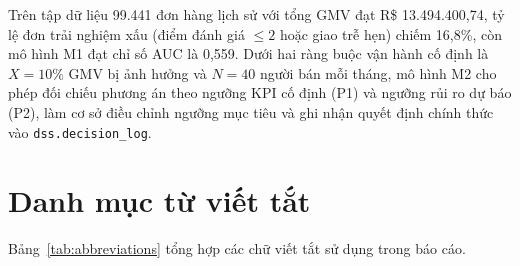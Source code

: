 \documentclass[a4paper]{article}
\begin{document}
Trên tập dữ liệu 99.441 đơn hàng lịch sử với tổng GMV đạt R\$ 13.494.400,74, tỷ lệ đơn trải nghiệm xấu (điểm đánh giá $\le 2$ hoặc giao trễ hẹn) chiếm 16,8\%, còn mô hình M1 đạt chỉ số AUC là 0,559. Dưới hai ràng buộc vận hành cố định là $X = 10\%$ GMV bị ảnh hưởng và $N = 40$ người bán mỗi tháng, mô hình M2 cho phép đối chiếu phương án theo ngưỡng KPI cố định (P1) và ngưỡng rủi ro dự báo (P2), làm cơ sở điều chỉnh ngưỡng mục tiêu và ghi nhận quyết định chính thức vào \texttt{dss.decision\_log}.

\newpage
{}
{}
\section*{Danh mục từ viết tắt}
\nopagebreak[4]
Bảng~\ref{tab:abbreviations} tổng hợp các chữ viết tắt sử dụng trong báo cáo.\par
\nopagebreak[4]
\end{document}
